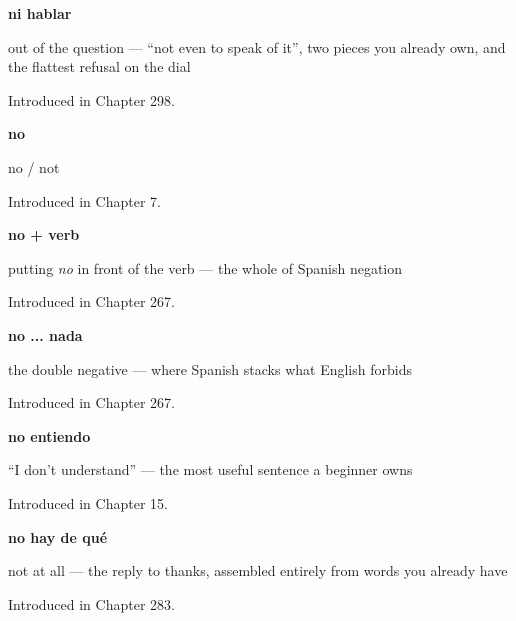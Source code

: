 \noindent\begin{minipage}[t]{\linewidth}
\raggedright
\textbf{ni hablar}\par
\small out of the question — \textquotedblleft{}not even to speak of it\textquotedblright{}, two pieces you already own, and the flattest refusal on the dial\par
\footnotesize Introduced in Chapter 298.
\end{minipage}\par\medskip

\noindent\begin{minipage}[t]{\linewidth}
\raggedright
\textbf{no}\par
\small no / not\par
\footnotesize Introduced in Chapter 7.
\end{minipage}\par\medskip

\noindent\begin{minipage}[t]{\linewidth}
\raggedright
\textbf{no + verb}\par
\small putting \emph{no} in front of the verb — the whole of Spanish negation\par
\footnotesize Introduced in Chapter 267.
\end{minipage}\par\medskip

\noindent\begin{minipage}[t]{\linewidth}
\raggedright
\textbf{no ... nada}\par
\small the double negative — where Spanish stacks what English forbids\par
\footnotesize Introduced in Chapter 267.
\end{minipage}\par\medskip

\noindent\begin{minipage}[t]{\linewidth}
\raggedright
\textbf{no entiendo}\par
\small \textquotedblleft{}I don't understand\textquotedblright{} — the most useful sentence a beginner owns\par
\footnotesize Introduced in Chapter 15.
\end{minipage}\par\medskip

\noindent\begin{minipage}[t]{\linewidth}
\raggedright
\textbf{no hay de qué}\par
\small not at all — the reply to thanks, assembled entirely from words you already have\par
\footnotesize Introduced in Chapter 283.
\end{minipage}\par\medskip

